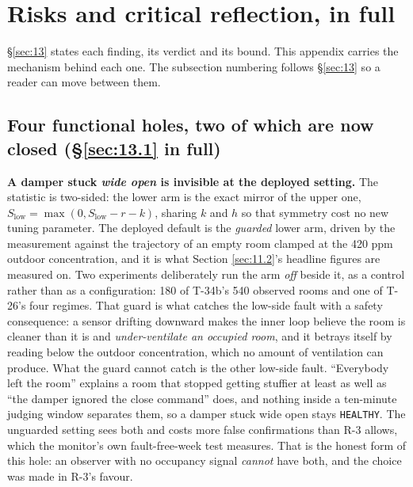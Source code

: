 \section{Risks and critical reflection, in full}\label{sec:I}

\S\ref{sec:13} states each finding, its verdict and its bound. This appendix carries the mechanism behind
each one. The subsection numbering follows \S\ref{sec:13} so a reader can move between them.

\subsection{Four functional holes, two of which are now closed (\texorpdfstring{\S\ref{sec:13.1}}{13.1} in full)}\label{sec:I.1}

\textbf{A damper stuck \emph{wide open} is invisible at the deployed setting.} The statistic is
two-sided: the lower arm is the exact mirror of the upper one, $S_\text{low} = \max(0, S_\text{low}
- r - k)$, sharing $k$ and $h$ so that symmetry cost no new tuning parameter. The deployed default
is the \emph{guarded} lower arm, driven by the measurement against the trajectory of an empty room
clamped at the 420 ppm outdoor concentration, and it is what Section \ref{sec:11.2}'s headline figures are
measured on. Two experiments deliberately run the arm \emph{off} beside it, as a control rather
than as a configuration: 180 of T-34b's 540 observed rooms and one of T-26's four regimes. That guard is
what catches the low-side fault with a safety consequence: a sensor drifting downward makes the
inner loop believe the room is cleaner than it is and \emph{under-ventilate an occupied room}, and
it betrays itself by reading below the outdoor concentration, which no amount of ventilation can
produce. What the guard cannot catch is the other low-side fault. ``Everybody left the room''
explains a room that stopped getting stuffier at least as well as ``the damper ignored the close
command'' does, and nothing inside a ten-minute judging window separates them, so a damper stuck
wide open stays \texttt{HEALTHY}. The unguarded setting sees both and costs more false confirmations
than R-3 allows, which the monitor's own fault-free-week test measures. That is the honest form of
this hole: an observer with no occupancy signal \emph{cannot} have both, and the choice was made in
R-3's favour.

